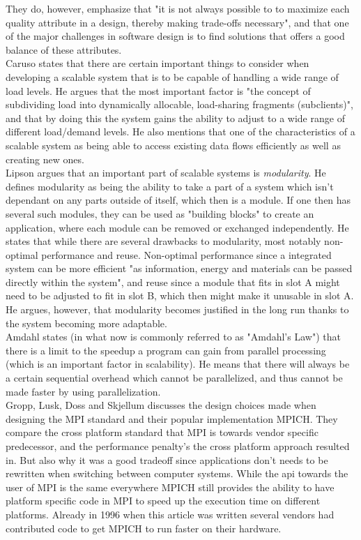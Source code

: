 \documentclass{article}
\begin{document}
They do, however, emphasize that "it is not always possible to to maximize
each quality attribute in a design, thereby making trade-offs necessary", and
that one of the major challenges in software design is to find solutions that
offers a good balance of these attributes.
\\

Caruso \cite{caruso1997toward} states that there are certain important things
to consider when developing a scalable system that is to be capable of handling
a wide range of load levels. He argues that the most important factor is "the
concept of subdividing load into dynamically allocable, load-sharing fragments
(subclients)", and that by doing this the system gains the ability to adjust to
a wide range of different load/demand levels.
He also mentions that one of the characteristics of a scalable system as being
able to access existing data flows efficiently as well as creating new ones.
\\

Lipson \cite{lipson2007principles} argues that an important part of scalable
systems is \emph{modularity}. He defines modularity as being the ability to
take a part of a system which isn't dependant on any parts outside of itself,
which then is a module. If one then has several such modules, they can be used
as "building blocks" to create an application, where each module can be removed
or exchanged independently.  He states that while there are several drawbacks
to modularity, most notably non-optimal performance and reuse.  Non-optimal
performance since a integrated system can be more efficient "as information,
energy and materials can be passed directly within the system", and reuse since
 a module that fits in slot A might need to be adjusted to fit in slot B,
which then might make it unusable in slot A. He argues, however, that
modularity becomes justified in the long run thanks to the system becoming more
adaptable.
\\

Amdahl \cite{amdahl1967validity} states (in what now is commonly referred to as
"Amdahl's Law") that there is a limit to the speedup a program can gain from
parallel processing (which is an important factor in scalability).  He means
that there will always be a certain sequential overhead which cannot be
parallelized, and thus cannot be made faster by using parallelization.
\\

Gropp, Lusk, Doss and Skjellum\cite{gropp1996high} discusses the design choices made when
designing the MPI standard and their popular implementation MPICH. They
compare the cross platform standard that MPI is towards vendor specific
predecessor, and the performance penalty's the cross platform approach resulted
in. But also why it was a good tradeoff since applications don't needs to be
rewritten when switching between computer systems. While the api towards
the user of MPI is the same everywhere MPICH still provides the ability to
have platform specific code in MPI to speed up the execution time on different
platforms. Already in 1996 when this article was written several vendors
had contributed code to get MPICH to run faster on their hardware.
\\
\end{document}
